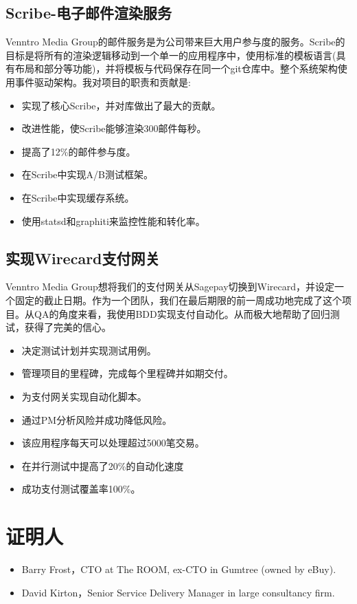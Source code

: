 \documentclass[a4paper]{twentysecondcv-chinese} %
\begin{document}
\subsection{Scribe-电子邮件渲染服务}

Venntro Media Group的邮件服务是为公司带来巨大用户参与度的服务。Scribe的目标是将所有的渲染逻辑移动到一个单一的应用程序中，使用标准的模板语言(具有布局和部分等功能)，并将模板与代码保存在同一个git仓库中。整个系统架构使用事件驱动架构。我对项目的职责和贡献是:
\begin{itemize}
  \item 实现了核心Scribe，并对库做出了最大的贡献。
  \item 改进性能，使Scribe能够渲染300邮件每秒。
  \item 提高了12\%的邮件参与度。
  \item 在Scribe中实现A/B测试框架。
  \item 在Scribe中实现缓存系统。
  \item 使用statsd和graphiti来监控性能和转化率。
\end{itemize}

\subsection{实现Wirecard支付网关}

Venntro Media Group想将我们的支付网关从Sagepay切换到Wirecard，并设定一个固定的截止日期。作为一个团队，我们在最后期限的前一周成功地完成了这个项目。从QA的角度来看，我使用BDD实现支付自动化。从而极大地帮助了回归测试，获得了完美的信心。
\begin{itemize}
    \item 决定测试计划并实现测试用例。
    \item 管理项目的里程碑，完成每个里程碑并如期交付。
    \item 为支付网关实现自动化脚本。
    \item 通过PM分析风险并成功降低风险。
    \item 该应用程序每天可以处理超过5000笔交易。
    \item 在并行测试中提高了20\%的自动化速度
    \item 成功支付测试覆盖率100\%。
\end{itemize}

\section{证明人}
\begin{itemize}
    \item Barry Frost，CTO at The ROOM, ex-CTO in Gumtree (owned by eBuy).
    \item David Kirton，Senior Service Delivery Manager in large consultancy firm.
\end{itemize}
\end{document}
